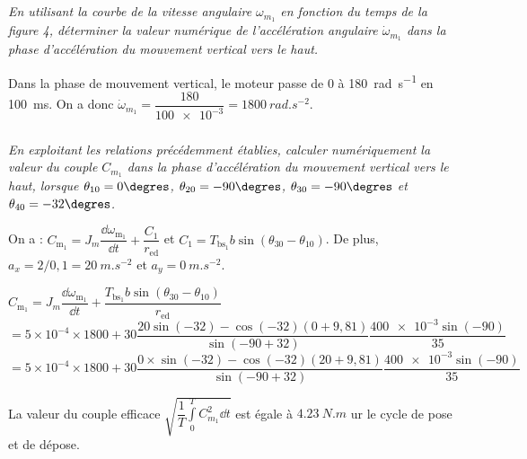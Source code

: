 \documentclass[10pt,fleqn]{article} %
\begin{document}
\fi

\subparagraph{\label{q}}\textit{En utilisant la courbe de la vitesse angulaire $\omega_{m_1}$ en fonction du temps de la figure 4, déterminer la valeur numérique de l’accélération angulaire $\dot{\omega}_{m_1}$ dans la phase d’accélération du mouvement vertical vers le haut.}
\ifprof
\begin{corrige}
Dans la phase de mouvement vertical, le moteur passe de 0 à \SI{180}{rad.s^{-1}} en \SI{100}{ms}. On a donc $\dot{\omega}_{m_1}=\dfrac{180}{\num{100e-3}} = \SI{1800}{rad.s^{-2}} $.
\end{corrige}
\else
\fi

\subparagraph{\label{q}}\textit{En exploitant les relations précédemment établies, calculer numériquement la valeur du couple $C_{m_1}$ dans la phase d’accélération du mouvement vertical vers le haut, lorsque $\theta_{10} = 0\degres$, $\theta_{20} = -90\degres$, $\theta_{30} = -90\degres$ et
$\theta_{40} = -32\degres$.}
\ifprof
\begin{corrige}
On a :
$  C_{\text{m}_1} =  J_m  \dfrac{\dd \omega_{\text{m}_1}}{\dd t} +  \dfrac{C_1}{r_{\text{ed}}}$ 
et
 $C_1 = T_{\text{bs}_1}  b \sin\left(\theta_{30}-\theta_{10}\right) $.
 De plus, $a_x = 2/0,1 = \SI{20}{m.s^{-2}}$ et $a_y =\SI{0}{m.s^{-2}}$. 
 
 $  C_{\text{m}_1} =  J_m  \dfrac{\dd \omega_{\text{m}_1}}{\dd t} +  \dfrac{T_{\text{bs}_1}  b \sin\left(\theta_{30}-\theta_{10}\right)}{r_{\text{ed}}}$ 
 $ =  5\times 10^{-4} \times 1800 +  
 30 \dfrac{ 20 \sin (-32)-\cos (-32)\left(0+9,81\right) }{\sin\left( -90+32\right)} \dfrac{  \num{400e-3} \sin\left( -90\right)}{35}$ 
  $ =  5\times 10^{-4} \times 1800 +  
 30 \dfrac{ 0\times \sin (-32)-\cos (-32)\left(20+9,81\right) }{\sin\left( -90+32\right)} \dfrac{  \num{400e-3} \sin\left( -90\right)}{35}$ 
 
\end{corrige}
\else
\fi

La valeur du couple efficace $\sqrt{\dfrac{1}{T}\int\limits_{0}^{T} C_{m_1}^2 \dd t}$ est égale à $\SI{4,23}{N.m}$ ur le cycle de pose et de dépose.
\end{document}
